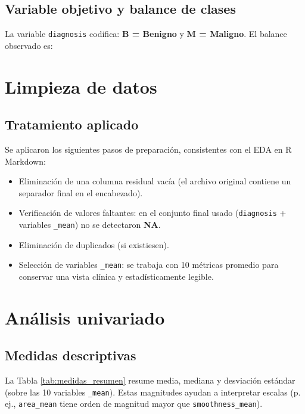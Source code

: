 \documentclass[12pt,a4paper]{article}
\begin{document}
\subsection{Variable objetivo y balance de clases}
La variable \texttt{diagnosis} codifica: \textbf{B = Benigno} y \textbf{M = Maligno}. El balance observado es:

\begin{table}[H]
\centering
\caption{Conteo de observaciones por diagnóstico.}
\label{tab:conteo_diagnostico}

\end{table}


\section{Limpieza de datos}

\subsection{Tratamiento aplicado}
Se aplicaron los siguientes pasos de preparación, consistentes con el EDA en R Markdown:
\begin{itemize}
    \item Eliminación de una columna residual vacía (el archivo original contiene un separador final en el encabezado).
    \item Verificación de valores faltantes: en el conjunto final usado (\texttt{diagnosis} + variables \texttt{\_mean}) no se detectaron \textbf{NA}.
    \item Eliminación de duplicados (si existiesen).
    \item Selección de variables \texttt{\_mean}: se trabaja con 10 métricas promedio para conservar una vista clínica y estadísticamente legible.
\end{itemize}


\section{Análisis univariado}

\subsection{Medidas descriptivas}
La Tabla \ref{tab:medidas_resumen} resume media, mediana y desviación estándar (sobre las 10 variables \texttt{\_mean}). Estas magnitudes ayudan a interpretar escalas (p. ej., \texttt{area\_mean} tiene orden de magnitud mayor que \texttt{smoothness\_mean}).
\end{document}
